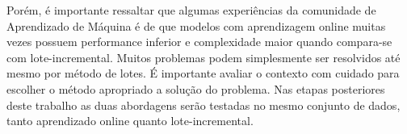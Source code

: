 Porém, é importante ressaltar que algumas experiências da comunidade de Aprendizado de Máquina é de que modelos com aprendizagem online muitas vezes possuem performance inferior e complexidade maior quando compara-se com lote-incremental. Muitos problemas podem simplesmente ser resolvidos até mesmo por método de lotes. É importante avaliar o contexto com cuidado para escolher o método apropriado a solução do problema. Nas etapas posteriores deste trabalho as duas abordagens serão testadas no mesmo conjunto de dados, tanto aprendizado online quanto lote-incremental.




 

